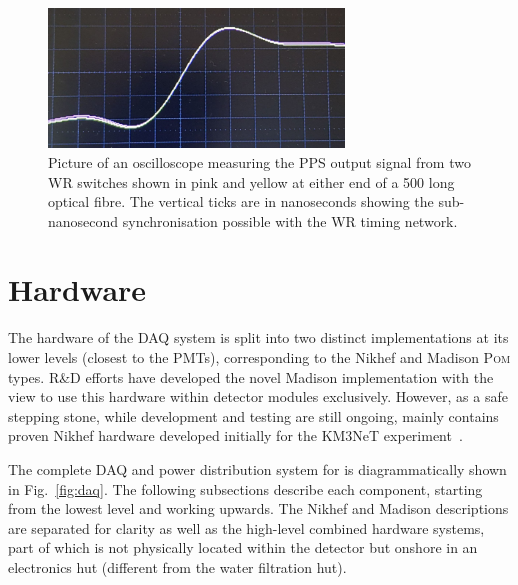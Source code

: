 \begin{figure} %
    \includegraphics[width=0.7\textwidth]{diagrams/5-daq/sync.pdf}
    \caption[Picture of White Rabbit timing synchronisation seen in \chips.]
    {Picture of an oscilloscope measuring the PPS output signal from two WR switches shown in pink
        and yellow at either end of a \unit{500}{} long optical fibre. The vertical
        ticks are in nanoseconds showing the sub-nanosecond synchronisation possible with the WR
        timing network.}
    \label{fig:sync}
\end{figure}

\section{Hardware} %
\label{sec:daq_hard} %

The hardware of the \chipsfive DAQ system is split into two distinct implementations at its lower
levels (closest to the PMTs), corresponding to the Nikhef and Madison \textsc{Pom} types. \chips R\&D
efforts have developed the novel Madison implementation with the view to use this hardware within
detector modules exclusively. However, as a safe stepping stone, while development and testing are
still ongoing, \chipsfive mainly contains proven Nikhef hardware developed initially for the
KM3NeT experiment~\cite{adrian2016}.

The complete DAQ and power distribution system for \chipsfive is diagrammatically shown in
Fig.~\ref{fig:daq}. The following subsections describe each component, starting from the lowest
level and working upwards. The Nikhef and Madison descriptions are separated for clarity as well
as the high-level combined hardware systems, part of which is not physically located within the
detector but onshore in an electronics hut (different from the water filtration hut).

